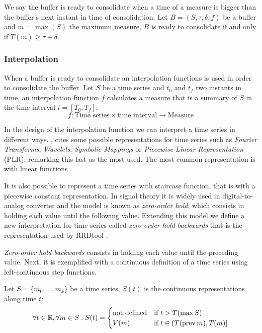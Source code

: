 \begin{definition}
  We say the buffer is ready to consolidate when a time of a measure
  is bigger than the buffer's next instant in time of consolidation.
  Let $B=(S,\tau,\delta,f)$ be a buffer and $m=\max(S)$ the maximum
  measure, $B$ is ready to consolidate if and only if $T(m) \geq
  \tau+\delta$.
\end{definition}

\subsubsection{Interpolation}

When a buffer is ready to consolidate an interpolation functions is
used in order to consolidate the buffer.  Let $S$ be a time series and
$t_0$ and $t_f$ two instants in time, an interpolation function $f$
calculates a measure that is a summary of $S$ in the time interval
$i=[T_0,T_f]$:
\[
f: \text{Time series} \times \text{time interval} \longrightarrow
\text{Measure}
\]


In the design of the interpolation function we can interpret a time
series in different ways. \textcite{last:keogh}, cites
some possible representations for time series such as \emph{Fourier
  Transforms}, \emph{Wavelets}, \emph{Symbolic Mappings} or
\emph{Piecewise Linear Representation} (PLR), remarking this last as
the most used. The most common representation is with linear
functions \parencite{keogh01}.

It is also possible to represent a time series with staircase
function, that is with a piecewise constant representation. In signal
theory it is widely used in digital-to-analog converter and the model
is known as \emph{zero-order hold}, which consists in holding each
value until the following value. Extending this model we define a new
interpretation for time series called \emph{zero-order hold backwards}
that is the representation used by RRDtool \parencite{lisa98:oetiker}.

\emph{Zero-order hold backwards} consists in holding each value until
the preceding value. Next, it is exemplified with a continuous
definition of a time series using left-continuous step functions.

\begin{definition}
  Let $S=\{m_0,\ldots,m_k\}$ be a time series, $S(t)$ is the
  continuous representations along time $t$:
\[
\forall t \in \mathbb{R}  ,\forall m \in S:
S(t) =  
\begin{cases}
  \text{not defined} & \text{if } t > T(\max S) \\
  V(m) & \text{if }  t\in (T(\operatorname*{prev} m),T(m)]
\end{cases}
\]
\end{definition}



